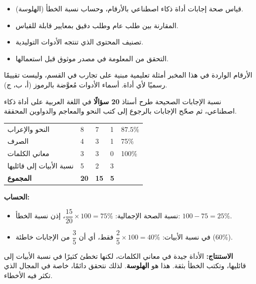 \documentclass[a4paper]{article}
\begin{document}

\begin{itemize}
    \item قياس صحة إجابات أداة ذكاء اصطناعي بالأرقام، وحساب نسبة الخطأ (الهلوسة).
    \item المقارنة بين طلب عام وطلب دقيق بمعايير قابلة للقياس.
    \item تصنيف المحتوى الذي تنتجه الأدوات التوليدية.
    \item التحقق من المعلومة في مصدر موثوق قبل استعمالها.
\end{itemize}

\begin{tanbih}
    الأرقام الواردة في هذا المخبر أمثلة تعليمية مبنية على تجارب في القسم،
    وليست تقييمًا رسميًا لأي أداة. أسماء الأدوات مُعوَّضة بالرموز (أ، ب، ج).
\end{tanbih}

\nisba


\begin{mithal}{نسبة الإجابات الصحيحة}
طرح أستاذ \textbf{20 سؤالًا} في اللغة العربية على أداة ذكاء اصطناعي،
ثم صحّح الإجابات بالرجوع إلى كتب النحو والمعاجم والدواوين المحققة.

\begin{center}
\begin{tabular}{|R{4.6cm}|C{2.2cm}|C{2cm}|C{2cm}|C{2.6cm}|}
    \hline
     &  &  &  &  \\ \hline
    النحو والإعراب              & 8  & 7  & 1 & $87.5\%$ \\ \hline
    الصرف                       & 4  & 3  & 1 & 75\% \\ \hline
    معاني الكلمات               & 3  & 3  & 0 & 100\% \\ \hline
    نسبة الأبيات إلى قائليها    & 5  & 2  & 3 &  \\ \hline
    \textbf{المجموع}            & \textbf{20} & \textbf{15} & \textbf{5} &  \\ \hline
\end{tabular}
\end{center}

\textbf{الحساب:}
\begin{itemize}
    \item نسبة الصحة الإجمالية: $\dfrac{15}{20}\times 100 = 75\%$،
          إذن نسبة الخطأ: $100 - 75 = 25\%$.
    \item في نسبة الأبيات: $\dfrac{2}{5}\times 100 = 40\%$ فقط، أي أن
          $\dfrac{3}{5}$ من الإجابات خاطئة ($60\%$).
\end{itemize}

\textbf{الاستنتاج:} الأداة جيدة في معاني الكلمات، لكنها تخطئ كثيرًا في نسبة الأبيات
إلى قائليها، وتكتب الخطأ بثقة. هذا هو \textbf{الهلوسة}. لذلك نتحقق دائمًا،
خاصة في المجال الذي تكثر فيه الأخطاء.
\end{mithal}
\end{document}
